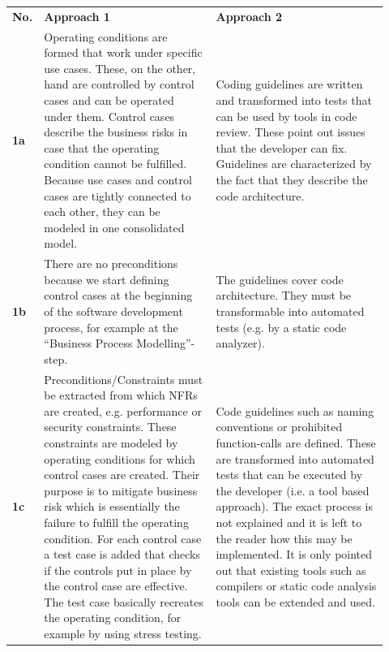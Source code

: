\begin{longtable}[h]{p{0.02\linewidth}p{0.45\linewidth}p{0.45\linewidth}}
	\centering
	\textbf{No.} & \textbf{Approach 1 \cite{ZouPavlovski2008}} & \textbf{Approach 2 \cite{Lagerstedt2014}} \\
	\textbf{1a} & 
	Operating conditions are formed that work under specific use cases.
	These, on the other, hand are controlled by control cases and can be operated under them.
	Control cases describe the business risks in case that the operating condition cannot be fulfilled.
	Because use cases and control cases are tightly connected to each other, they can be modeled in one consolidated model.
	& 
	
	Coding guidelines are written and transformed into tests that can be used by tools in code review.
	These point out issues that the developer can fix.
	Guidelines are characterized by the fact that they describe the code architecture.
	\\
	
	\textbf{1b} & 
	There are no preconditions because we start defining control cases at the beginning of the software development process, for example at the \enquote{Business Process Modelling}-step.
	
	&
	The guidelines cover code architecture. They must be transformable into automated tests (e.g. by a static code analyzer).
	
	\\
	
	\textbf{1c} &
	Preconditions/Constraints must be extracted from which NFRs are created, e.g. performance or security constraints.
	These constraints are modeled by operating conditions for which control cases are created.
	Their purpose is to mitigate business risk which is essentially the failure to fulfill the operating condition.
	For each control case a test case is added that checks if the controls put in place by the control case are effective.
	The test case basically recreates the operating condition, for example by using stress testing.
	
	&
	Code guidelines such as naming conventions or prohibited function-calls are defined.
	These are transformed into automated tests that can be executed by the developer (i.e. a tool based approach).
	The exact process is not explained and it is left to the reader how this may be implemented.
	It is only pointed out that existing tools such as compilers or static code analysis tools can be extended and used.
	\\
	

\end{longtable}
